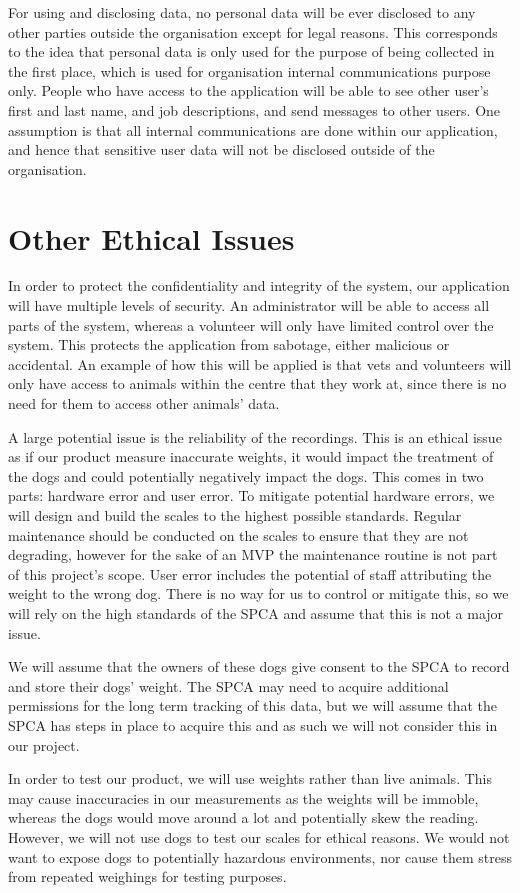 For using and disclosing data, no personal data will be ever disclosed to any other parties outside the organisation except for legal reasons. This corresponds to the idea that personal data is only used for the purpose of being collected in the first place, which is used for organisation internal communications purpose only. People who have access to the application will be able to see other user's first and last name, and job descriptions, and send messages to other users. One assumption is that all internal communications are done within our application, and hence that sensitive user data will not be disclosed outside of the organisation.


\section{Other Ethical Issues}

In order to protect the confidentiality and integrity of the system, our application will have multiple levels of security. An administrator will be able to access all parts of the system, whereas a volunteer will only have limited control over the system. This protects the application from sabotage, either malicious or accidental. An example of how this will be applied is that vets and volunteers will only have access to animals within the centre that they work at, since there is no need for them to access other animals’ data.
 
A large potential issue is the reliability of the recordings. This is an ethical issue as if our product measure inaccurate weights, it would impact the treatment of the dogs and could potentially negatively impact the dogs. This comes in two parts: hardware error and user error. To mitigate potential hardware errors, we will design and build the scales to the highest possible standards. Regular maintenance should be conducted on the scales to ensure that they are not degrading, however for the sake of an MVP the maintenance routine is not part of this project's scope. User error includes the potential of staff attributing the weight to the wrong dog. There is no way for us to control or mitigate this, so we will rely on the high standards of the SPCA and assume that this is not a major issue. 

We will assume that the owners of these dogs give consent to the SPCA to record and store their dogs’ weight. The SPCA may need to acquire additional permissions for the long term tracking of this data, but we will assume that the SPCA has steps in place to acquire this and as such we will not consider this in our project.

In order to test our product, we will use weights rather than live animals. This may cause inaccuracies in our measurements as the weights will be immoble, whereas the dogs would move around a lot and potentially skew the reading. However, we will not use dogs to test our scales for ethical reasons. We would not want to expose dogs to potentially hazardous environments, nor cause them stress from repeated weighings for testing purposes.




